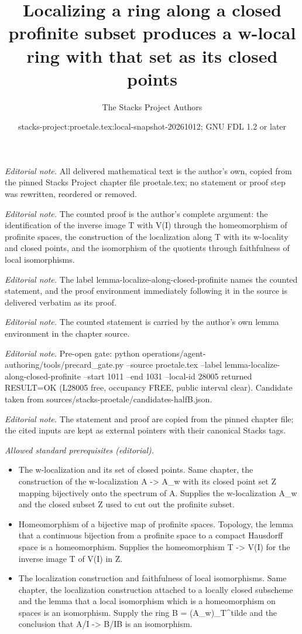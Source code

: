 \documentclass[10pt,a4paper]{amsart}
\title{Localizing a ring along a closed profinite subset produces a w-local ring with that set as its closed points}
\author{The Stacks Project Authors}
\date{stacks-project:proetale.tex:local-snapshot-20261012; GNU FDL 1.2 or later}
\theoremstyle{plain}
\theoremstyle{definition}
\theoremstyle{remark}
\numberwithin{equation}{subsection}
\begin{document}
\maketitle
\noindent\textit{Editorial note.} All delivered mathematical text is the author's own, copied from the pinned Stacks Project chapter file proetale.tex; no statement or proof step was rewritten, reordered or removed.\par\medskip
\noindent\textit{Editorial note.} The counted proof is the author's complete argument: the identification of the inverse image T with V(I) through the homeomorphism of profinite spaces, the construction of the localization along T with its w-locality and closed points, and the isomorphism of the quotients through faithfulness of local isomorphisms.\par\medskip
\noindent\textit{Editorial note.} The label lemma-localize-along-closed-profinite names the counted statement, and the proof environment immediately following it in the source is delivered verbatim as its proof.\par\medskip
\noindent\textit{Editorial note.} The counted statement is carried by the author's own lemma environment in the chapter source.\par\medskip
\noindent\textit{Editorial note.} Pre-open gate: python operations/agent-authoring/tools/precard\_gate.py --source proetale.tex --label lemma-localize-along-closed-profinite --start 1011 --end 1031 --local-id 28005 returned RESULT=OK (L28005 free, occupancy FREE, public interval clear). Candidate taken from sources/stacks-proetale/candidates-halfB.json.\par\medskip
\noindent\textit{Editorial note.} The statement and proof are copied from the pinned chapter file; the cited inputs are kept as external pointers with their canonical Stacks tags.\par\medskip
\noindent\textit{Allowed standard prerequisites (editorial).}\begin{itemize}
\item The w-localization and its set of closed points. Same chapter, the construction of the w-localization A -> A\_w with its closed point set Z mapping bijectively onto the spectrum of A. Supplies the w-localization A\_w and the closed subset Z used to cut out the profinite subset.
\item Homeomorphism of a bijective map of profinite spaces. Topology, the lemma that a continuous bijection from a profinite space to a compact Hausdorff space is a homeomorphism. Supplies the homeomorphism T -> V(I) for the inverse image T of V(I) in Z.
\item The localization construction and faithfulness of local isomorphisms. Same chapter, the localization construction attached to a locally closed subscheme and the lemma that a local isomorphism which is a homeomorphism on spaces is an isomorphism. Supply the ring B = (A\_w)\_T\textasciicircum{}tilde and the conclusion that A/I -> B/IB is an isomorphism.
\end{itemize}\medskip
\end{document}
